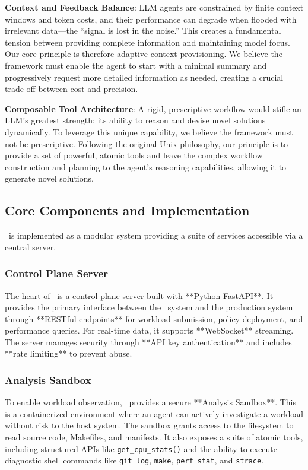 \textbf{Context and Feedback Balance}: LLM agents are constrained by finite context windows and token costs, and their performance can degrade when flooded with irrelevant data—the ``signal is lost in the noise.'' This creates a fundamental tension between providing complete information and maintaining model focus. Our core principle is therefore adaptive context provisioning. We believe the framework must enable the agent to start with a minimal summary and progressively request more detailed information as needed, creating a crucial trade-off between cost and precision.

\textbf{Composable Tool Architecture}: A rigid, prescriptive workflow would stifle an LLM's greatest strength: its ability to reason and devise novel solutions dynamically. To leverage this unique capability, we believe the framework must not be prescriptive. Following the original Unix philosophy, our principle is to provide a set of powerful, atomic tools and leave the complex workflow construction and planning to the agent's reasoning capabilities, allowing it to generate novel solutions.

\subsection{Core Components and Implementation}
\sys\ is implemented as a modular system providing a suite of services accessible via a central server.

\subsubsection{Control Plane Server}
The heart of \sys\ is a control plane server built with **Python FastAPI**. It provides the primary interface between the \agent\ system and the production system through **RESTful endpoints** for workload submission, policy deployment, and performance queries. For real-time data, it supports **WebSocket** streaming. The server manages security through **API key authentication** and includes **rate limiting** to prevent abuse.

\subsubsection{Analysis Sandbox}
To enable workload observation, \sys\ provides a secure **Analysis Sandbox**. This is a containerized environment where an agent can actively investigate a workload without risk to the host system. The sandbox grants access to the filesystem to read source code, Makefiles, and manifests. It also exposes a suite of atomic tools, including structured APIs like \texttt{get\_cpu\_stats()} and the ability to execute diagnostic shell commands like \texttt{git log}, \texttt{make}, \texttt{perf stat}, and \texttt{strace}.

